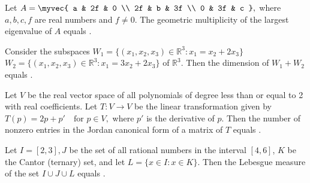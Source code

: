 \item Let 
$
A = \myvec{
    a & 2f & 0 \\
    2f & b & 3f \\
    0 & 3f & c
}, 
$
where $ a, b, c, f $ are real numbers and $ f \neq 0 $. The geometric multiplicity of the largest eigenvalue of $ A $ equals \underline{\hspace{2cm}}.

\bigskip

\item Consider the subspaces 
$
W_1 = \{(x_1, x_2, x_3) \in \mathbb{R}^3 : x_1 = x_2 + 2x_3\}
$
$
W_2 = \{(x_1, x_2, x_3) \in \mathbb{R}^3 : x_1 = 3x_2 + 2x_3\}
$
of $ \mathbb{R}^3 $. Then the dimension of $ W_1 + W_2 $ equals \underline{\hspace{2cm}}.

\bigskip

\item Let $ V $ be the real vector space of all polynomials of degree less than or equal to 2 with real coefficients. Let 
$
T : V \to V
$
be the linear transformation given by 
$
T(p) = 2p + p' \quad \text{for } p \in V,
$
where $ p' $ is the derivative of $ p $. Then the number of nonzero entries in the Jordan canonical form of a matrix of $ T $ equals \underline{\hspace{2cm}}.
\bigskip


\item Let $ I = [2, 3], J $ be the set of all rational numbers in the interval $ [4, 6] $, $ K $ be the Cantor (ternary) set, and let 
$
L = \{x \in I : x \in K\}.
$
Then the Lebesgue measure of the set $ I \cup J \cup L $ equals \underline{\hspace{2cm}}.
\bigskip



